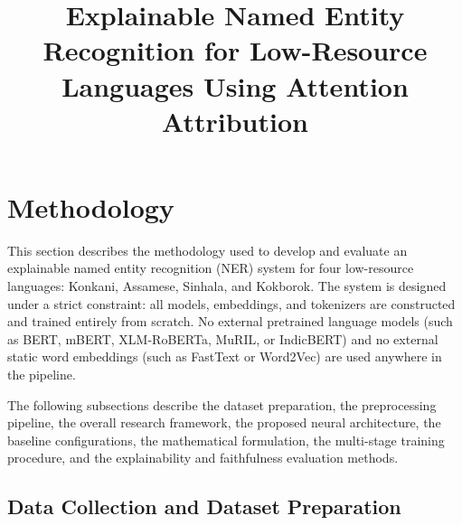 \documentclass[pdflatex,sn-mathphys-num]{sn-jnl}
\begin{document}
\title[Explainable NER for Low-Resource Languages]{Explainable Named Entity Recognition for Low-Resource Languages Using Attention Attribution}

\author*[1]{ }



\maketitle

\section{Methodology}\label{sec:methodology}

This section describes the methodology used to develop and evaluate an explainable named entity recognition (NER) system for four low-resource languages: Konkani, Assamese, Sinhala, and Kokborok. The system is designed under a strict constraint: all models, embeddings, and tokenizers are constructed and trained entirely from scratch. No external pretrained language models (such as BERT, mBERT, XLM-RoBERTa, MuRIL, or IndicBERT) and no external static word embeddings (such as FastText or Word2Vec) are used anywhere in the pipeline.

The following subsections describe the dataset preparation, the preprocessing pipeline, the overall research framework, the proposed neural architecture, the baseline configurations, the mathematical formulation, the multi-stage training procedure, and the explainability and faithfulness evaluation methods.

\subsection{Data Collection and Dataset Preparation}\label{subsec:data_prep}
\end{document}
